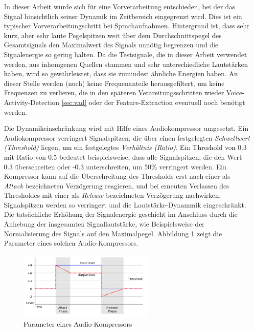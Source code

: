 In dieser Arbeit wurde sich für eine Vorverarbeitung entschieden, bei der das Signal hinsichtlich seiner Dynamik im Zeitbereich eingegrenzt wird. Dies ist ein typischer Vorverarbeitungschritt bei Sprachaufnahmen. Hintergrund ist, dass sehr kurz, aber sehr laute Pegelspitzen weit über dem Durchschnittspegel des Gesamtsignals den Maximalwert des Signals unnötig begrenzen und die Signalenergie so gering halten. Da die Testsignale, die in dieser Arbeit verwendet werden, aus inhomgenen Quellen stammen und sehr unterschiedliche Lautstärken haben, wird so gewährleistet, dass sie zumindest ähnliche Energien haben. An dieser Stelle werden (noch) keine Frequenanteile herausgefiltert, um keine Frequenzen zu verlieren, die in den späteren Verareitungsschritten wieder Voice-Activity-Detection \ref{sec:vad} oder der Feature-Extraction eventuell noch benötigt werden.

Die Dynamikeinschränkung wird mit Hilfe eines Audiokompressor umgesetzt. Ein Audiokompressor verringert Signalspitzen, die über einen festgelegten \emph{Schwellwert (Threshold)} liegen, um ein festgelegtes \emph{Verhältnis (Ratio)}. Ein Threshold von 0.3 mit Ratio von 0.5 bedeutet beispielsweise, dass alle Signalspitzen, die den Wert 0.3 überschreiten oder -0.3 unterschreiten, um 50\% verringert werden. Ein Kompressor kann auf die Überschreitung des Thresholds erst nach einer als \emph{Attack} bezeichneten Verzögerung reagieren, und bei erneuten Verlassen des Thresholdes mit einer als \emph{Release} bezeichneten Verzögerung nachwirken. Signalspitzen werden so verringert und die Lautstärke-Dynammik eingeschränkt. Die tatsächliche Erhöhung der Signalenergie geschieht im Anschluss durch die Anhebung der insgesamten Signallautstärke, wie Beispielsweise der Normalisierung des Signals auf den Maximalpegel. Abbildung \ref{img:compressor} zeigt die Parameter eines solchen Audio-Kompressors.

\begin{figure}[h]
	\centering
	\includegraphics[width=0.6\textwidth]{bilder/compressor.png}
	\caption{Parameter eines Audio-Kompressors}
	\label{img:compressor}
\end{figure}

